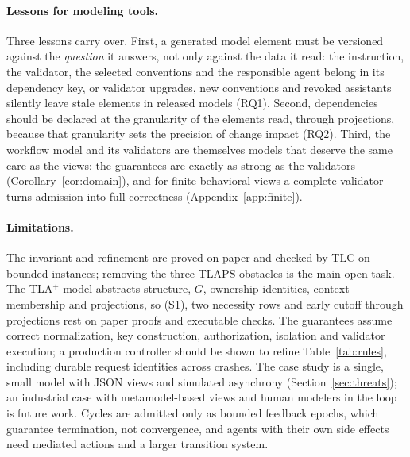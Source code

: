\documentclass[pdflatex,sn-mathphys-num]{sn-jnl}
\theoremstyle{thmstyleone}%
\theoremstyle{thmstyletwo}%
\theoremstyle{thmstylethree}%
\newcommand{\tla}{TLA$^+$}
\begin{document}
\paragraph{Lessons for modeling tools.} Three lessons carry over. First, a generated model element must be versioned against the \emph{question} it answers, not only against the data it read: the instruction, the validator, the selected conventions and the responsible agent belong in its dependency key, or validator upgrades, new conventions and revoked assistants silently leave stale elements in released models (RQ1). Second, dependencies should be declared at the granularity of the elements read, through projections, because that granularity sets the precision of change impact (RQ2). Third, the workflow model and its validators are themselves models that deserve the same care as the views: the guarantees are exactly as strong as the validators (Corollary~\ref{cor:domain}), and for finite behavioral views a complete validator turns admission into full correctness (Appendix~\ref{app:finite}).

\paragraph{Limitations.} The invariant and refinement are proved on paper and checked by TLC on bounded instances; removing the three TLAPS obstacles is the main open task. The \tla{} model abstracts structure, $G$, ownership identities, context membership and projections, so (S1), two necessity rows and early cutoff through projections rest on paper proofs and executable checks. The guarantees assume correct normalization, key construction, authorization, isolation and validator execution; a production controller should be shown to refine Table~\ref{tab:rules}, including durable request identities across crashes. The case study is a single, small model with JSON views and simulated asynchrony (Section~\ref{sec:threats}); an industrial case with metamodel-based views and human modelers in the loop is future work. Cycles are admitted only as bounded feedback epochs, which guarantee termination, not convergence, and agents with their own side effects need mediated actions and a larger transition system.
\end{document}
